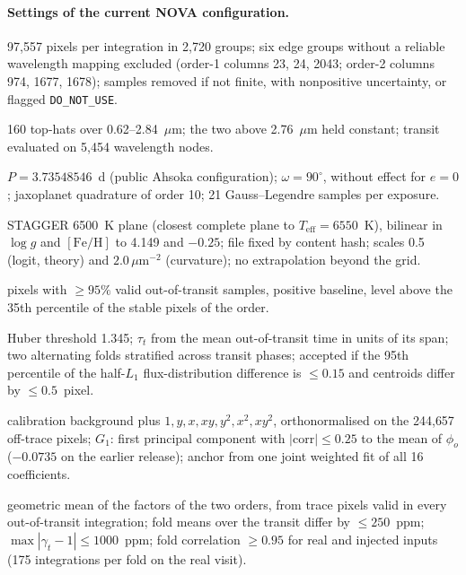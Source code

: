 \paragraph{Settings of the current NOVA configuration.}\label{tab:nova-settings}
{\footnotesize
\begin{description}[font=\normalfont\itshape,leftmargin=0pt,itemsep=0pt,topsep=2pt]
  \item[Support.] 97{,}557 pixels per integration in 2{,}720 groups; six edge groups without a reliable wavelength mapping excluded (order-1 columns 23, 24, 2043; order-2 columns 974, 1677, 1678); samples removed if not finite, with nonpositive uncertainty, or flagged \texttt{DO\_NOT\_USE}.
  \item[Spectral basis.] 160 top-hats over 0.62--2.84~$\mu\mathrm{m}$; the two above 2.76~$\mu\mathrm{m}$ held constant; transit evaluated on 5{,}454 wavelength nodes.
  \item[Orbit and transit.] $P=3.73548546$~d (public Ahsoka configuration); $\omega=90^\circ$, without effect for $e=0$; jaxoplanet quadrature of order 10; 21 Gauss--Legendre samples per exposure.
  \item[Limb-darkening reference.] STAGGER 6500~K plane (closest complete plane to $T_{\mathrm{eff}}=6550$~K), bilinear in $\log g$ and $[\mathrm{Fe}/\mathrm{H}]$ to 4.149 and $-0.25$; file fixed by content hash; scales 0.5 (logit, theory) and $2.0\,\mu\mathrm{m}^{-2}$ (curvature); no extrapolation beyond the grid.
  \item[Response template.] pixels with $\geq95\%$ valid out-of-transit samples, positive baseline, level above the 35th percentile of the stable pixels of the order.
  \item[Response fit and folds.] Huber threshold 1.345; $\tau_t$ from the mean out-of-transit time in units of its span; two alternating folds stratified across transit phases; accepted if the 95th percentile of the half-$L_1$ flux-distribution difference is $\leq0.15$ and centroids differ by $\leq0.5$~pixel.
  \item[Background.] calibration background plus $1,y,x,xy,y^2,x^2,xy^2$, orthonormalised on the 244{,}657 off-trace pixels; $G_1$: first principal component with $|\mathrm{corr}|\leq0.25$ to the mean of $\phi_o$ ($-0.0735$ on the earlier release); anchor from one joint weighted fit of all 16 coefficients.
  \item[Curvature factor.] geometric mean of the factors of the two orders, from trace pixels valid in every out-of-transit integration; fold means over the transit differ by $\leq250$~ppm; $\max|\gamma_t-1|\leq1000$~ppm; fold correlation $\geq0.95$ for real and injected inputs (175 integrations per fold on the real visit).

\end{description}}

